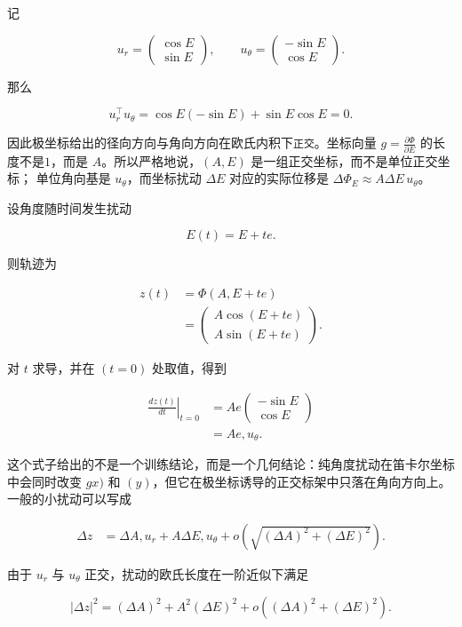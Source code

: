 记

\[
u_r=
\begin{pmatrix}
\cos E\\
\sin E
\end{pmatrix},
\qquad
u_\theta=
\begin{pmatrix}
-\sin E\\
\cos E
\end{pmatrix}.
\]

那么

\[
u_r^\top u_\theta
=\cos E(-\sin E)+\sin E\cos E
=0.
\]

因此极坐标给出的径向方向与角向方向在欧氏内积下\verb|正交|。坐标向量 \(g=\frac{\partial \Phi}{\partial E}\) 的长度不是\( 1 \)，而是 \( A \)。所以严格地说，\((A,E)\) 是一组正交坐标，而不是单位正交坐标；
单位角向基是 \(u_\theta\)，而坐标扰动 \(\Delta E\) 对应的实际位移是 \(\Delta \Phi_E \approx A\Delta E\,u_\theta\)。

设角度随时间发生扰动

\[
E(t)=E+te.
\]

则轨迹为

\begin{align}
z(t)&=\Phi(A, E+te)\\
&=
\begin{pmatrix}
A\cos(E+te)\\
A\sin(E+te)
\end{pmatrix}.
\end{align}

对 \(t\) 求导，并在 \((t=0)\) 处取值，得到

\begin{align}
\left.\frac{dz(t)}{dt}\right|_{t=0}
&=
Ae
\begin{pmatrix}
-\sin E\\
\cos E
\end{pmatrix}\\
&=Ae,u_\theta.
\end{align}

这个式子给出的不是一个训练结论，而是一个几何结论：纯角度扰动在笛卡尔坐标中会同时改变 \(gx)\) 和 \((y)\)，但它在极坐标诱导的正交标架中只落在角向方向上。一般的小扰动可以写成

\begin{align}
\Delta z
&=
\Delta A,u_r + A\Delta E,u_\theta + o\left(\sqrt{(\Delta A)^2+(\Delta E)^2}\right).
\end{align}

由于 \(u_r\) 与 \(u_\theta\) 正交，扰动的欧氏长度在一阶近似下满足

\[
|\Delta z|^2
=(\Delta A)^2 + A^2(\Delta E)^2 + o\left((\Delta A)^2+(\Delta E)^2\right).
\]

